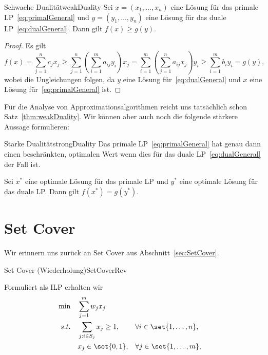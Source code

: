 \documentclass[language=ngerman,algolist]{TemplateLecture}
\begin{document}
\begin{thm}{Schwache Dualität}{weakDuality}
    Sei $x = (x_1, \ldots, x_n)$ eine Lösung für das primale LP~\eqref{eq:primalGeneral} und $y = (y_1, \ldots, y_n)$ eine Lösung für das duale LP~\eqref{eq:dualGeneral}. Dann gilt $f(x) \geq g(y)$.  
\end{thm}

\begin{proof}
    Es gilt 
    \begin{equation}
        f(x) = \sum_{j = 1}^n c_j x_j \geq \sum_{j = 1}^n \left( \sum_{i = 1}^m a_{ij} y_i \right) x_j = \sum_{i = 1}^m \left( \sum_{j = 1}^n a_{ij} x_j \right) y_i \geq \sum_{i = 1}^m b_i y_i = g(y),
    \end{equation}
    wobei die Ungleichungen folgen, da $y$ eine Lösung für~\eqref{eq:dualGeneral} und $x$ eine Lösung für~\eqref{eq:primalGeneral} ist.
\end{proof}

Für die Analyse von Approximationsalgorithmen reicht uns tatsächlich schon Satz~\ref{thm:weakDuality}. Wir können aber auch noch die folgende stärkere Aussage formulieren:

\begin{thm}{Starke Dualität}{strongDuality}
    Das primale LP~\eqref{eq:primalGeneral} hat genau dann einen beschränkten, optimalen Wert wenn dies für das duale LP~\eqref{eq:dualGeneral} der Fall ist.

    Sei $x^*$ eine optimale Lösung für das primale LP und $y^*$ eine optimale Lösung für das duale LP. Dann gilt $f(x^*) = g(y^*)$.
\end{thm}

\section{Set Cover}
Wir erinnern uns zurück an Set Cover aus Abschnitt~\ref{sec:SetCover}. 

\begin{prob}{Set Cover (Wiederholung)}{SetCoverRev}
\end{prob}

Formuliert als ILP erhalten wir
\begin{equation*}
    \begin{aligned}
        \min \quad & \sum_{j = 1}^m w_j x_j \\
        s.t. \quad & \sum_{j: i \in S_j} x_j \geq 1, && \forall i \in \set{1,\ldots,n}, \\
                   & x_j \in \set{0,1}, && \forall j \in \set{1,\ldots,m},
    \end{aligned}
\end{equation*}
\end{document}
